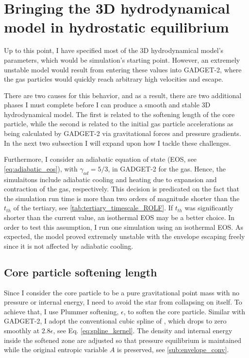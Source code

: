 \section{Bringing the 3D hydrodynamical model in hydrostatic equilibrium}

Up to this point, I have specified most of the 3D hydrodynamical model's parameters, which would be simulation's starting point. However, an extremely unstable model would result from entering these values into GADGET-2, where the gas particles would quickly reach arbitrary high velocities and escape.

There are two causes for this behavior, and as a result, there are two additional phases I must complete before I can produce a smooth and stable 3D hydrodynamical model. The first is related to the softening length of the core particle, while the second is related to the initial gas particle accelerations as being calculated by GADGET-2 via gravitational forces and pressure gradients. In the next two subsection I will expand upon how I tackle these challenges. 

Furthermore, I consider an adiabatic equation of state (EOS, see \cref{eq:adiabatic_eos}), with $\gamma_{ad} = 5/3$, in GADGET-2 for the gas. Hence, the simulaitons include adiabatic cooling and heating due to expansion and contraction of the gas, respectively. This decision is predicated on the fact that the simulation run time is more than two orders of magnitude shorter than the $t_{th}$ of the tertiary, see \cref{tab:tertiary_timescale_ROLF}. If $t_{th}$ was significantly shorter than the current value, an isothermal EOS may be a better choice. In order to test this assumption, I run one simulation using an isothermal EOS. As expected, the model proved extremely unstable with the envelope escaping freely since it is not affected by adiabatic cooling.

\subsection{Core particle softening length}

Since I consider the core particle to be a pure gravitational point mass with no pressure or internal energy, I need to avoid the star from collapsing on itself.
To achieve that, I use Plummer softening, $\epsilon$, to soften the core particle. Similar with GADGET-2, I adopt the conventional cubic spline of \cite{monaghan1985refined}, which drops to zero smoothly at $2.8 \epsilon$, see Eq. \eqref{eq:spline_kernel}. The density and internal energy inside the softened zone are adjusted so that pressure equilibrium is maintained while the original entropic variable $A$ is preserved, see \cref{sub:envelope_conv}. 


